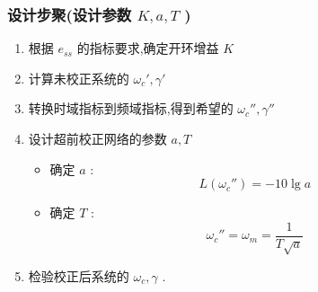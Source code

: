 \documentclass[table]{article}
\begin{document}
\begin{frame}
\frametitle{设计步聚(设计参数 $K,a,T$ )}
\label{sec-2-1-4}

\begin{enumerate}
\item 根据 $e_{ss}$ 的指标要求,确定开环增益 $K$
\item 计算未校正系统的 $\omega_c',\gamma'$
\item 转换时域指标到频域指标,得到希望的 $\omega_c'',\gamma''$
\item <2->设计超前校正网络的参数 $a,T$
\begin{itemize}
\item <2->确定 $a$  :  
          \[L(\omega_c'')=-10\lg a\]
\item <2->确定 $T$  :  
         \[\omega_c'' = \omega_m = \frac{1}{T\sqrt{a}}\]
\end{itemize}
\item <3->检验校正后系统的 $\omega_c,\gamma$ .
\end{enumerate}
\end{frame}
\end{document}
